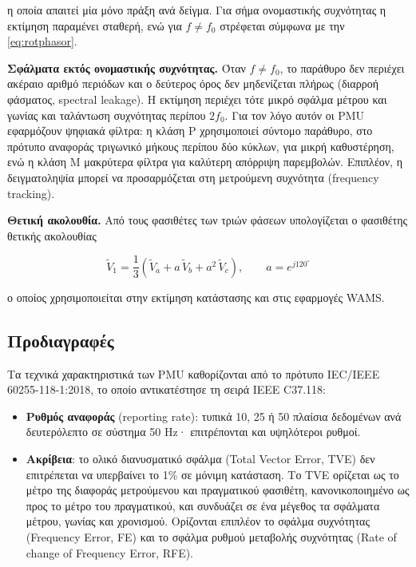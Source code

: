 η οποία απαιτεί μία μόνο πράξη ανά δείγμα. Για σήμα ονομαστικής συχνότητας η εκτίμηση
παραμένει σταθερή, ενώ για $f \neq f_0$ στρέφεται σύμφωνα με την \eqref{eq:rotphasor}.

\textbf{Σφάλματα εκτός ονομαστικής συχνότητας.} Όταν $f \neq f_0$, το παράθυρο δεν περιέχει
ακέραιο αριθμό περιόδων και ο δεύτερος όρος δεν μηδενίζεται πλήρως (διαρροή φάσματος,
spectral leakage). Η εκτίμηση περιέχει τότε μικρό σφάλμα μέτρου και γωνίας και ταλάντωση
συχνότητας περίπου $2f_0$. Για τον λόγο αυτόν οι PMU εφαρμόζουν ψηφιακά φίλτρα: η κλάση P
χρησιμοποιεί σύντομο παράθυρο, στο πρότυπο αναφοράς τριγωνικό μήκους περίπου δύο κύκλων, για
μικρή καθυστέρηση, ενώ η κλάση M μακρύτερα φίλτρα για καλύτερη απόρριψη παρεμβολών.
Επιπλέον, η δειγματοληψία μπορεί να προσαρμόζεται στη μετρούμενη συχνότητα (frequency
tracking).

\textbf{Θετική ακολουθία.} Από τους φασιθέτες των τριών φάσεων υπολογίζεται ο φασιθέτης θετικής
ακολουθίας

\begin{equation}
\tilde{V}_1 = \frac{1}{3}\left(\tilde{V}_a + a\,\tilde{V}_b + a^2\,\tilde{V}_c\right),
\qquad a = e^{j120^\circ}
\label{eq:posseq}
\end{equation}

ο οποίος χρησιμοποιείται στην εκτίμηση κατάστασης και στις εφαρμογές WAMS.


\subsection{Προδιαγραφές}

Τα τεχνικά χαρακτηριστικά των PMU καθορίζονται από το πρότυπο IEC/IEEE 60255-118-1:2018, το
οποίο αντικατέστησε τη σειρά IEEE C37.118:

\begin{itemize}
\item \textbf{Ρυθμός αναφοράς} (reporting rate): τυπικά 10, 25 ή 50 πλαίσια δεδομένων ανά
      δευτερόλεπτο σε σύστημα 50 Hz· επιτρέπονται και υψηλότεροι ρυθμοί.
\item \textbf{Ακρίβεια}: το ολικό διανυσματικό σφάλμα (Total Vector Error, TVE) δεν
      επιτρέπεται να υπερβαίνει το 1\% σε μόνιμη κατάσταση. Το TVE ορίζεται ως το μέτρο της
      διαφοράς μετρούμενου και πραγματικού φασιθέτη, κανονικοποιημένο ως προς το μέτρο του
      πραγματικού, και συνδυάζει σε ένα μέγεθος τα σφάλματα μέτρου, γωνίας και χρονισμού.
      Ορίζονται επιπλέον το σφάλμα συχνότητας (Frequency Error, FE) και το σφάλμα ρυθμού
      μεταβολής συχνότητας (Rate of change of Frequency Error, RFE).
\end{itemize}

